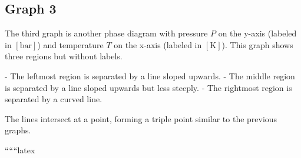\subsection*{Graph 3}
The third graph is another phase diagram with pressure \( P \) on the y-axis (labeled in \([ \text{bar} ]\)) and temperature \( T \) on the x-axis (labeled in \([ \text{K} ]\)). This graph shows three regions but without labels.

- The leftmost region is separated by a line sloped upwards.
- The middle region is separated by a line sloped upwards but less steeply.
- The rightmost region is separated by a curved line.

The lines intersect at a point, forming a triple point similar to the previous graphs.

``````latex